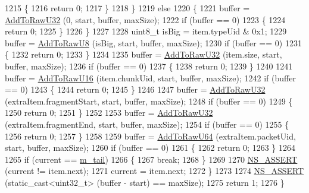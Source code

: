 \begin{DoxyCode}
1215             \{
1216               \textcolor{keywordflow}{return} 0;
1217             \}
1218         \}
1219       \textcolor{keywordflow}{else}
1220         \{
1221           buffer = \hyperlink{classns3_1_1PacketMetadata_a5ae4821ac2aae1d62c02243cdd27572a}{AddToRawU32} (0, start, buffer, maxSize);
1222           \textcolor{keywordflow}{if} (buffer == 0) 
1223             \{
1224               \textcolor{keywordflow}{return} 0;
1225             \}
1226         \}
1227 
1228       uint8\_t isBig = item.typeUid & 0x1;
1229       buffer = \hyperlink{classns3_1_1PacketMetadata_acf61c8b898fa059a3c3de4aa03c8c0c3}{AddToRawU8} (isBig, start, buffer, maxSize);
1230       \textcolor{keywordflow}{if} (buffer == 0) 
1231         \{
1232           \textcolor{keywordflow}{return} 0;
1233         \}
1234 
1235       buffer = \hyperlink{classns3_1_1PacketMetadata_a5ae4821ac2aae1d62c02243cdd27572a}{AddToRawU32} (item.size, start, buffer, maxSize);
1236       \textcolor{keywordflow}{if} (buffer == 0) 
1237         \{
1238           \textcolor{keywordflow}{return} 0;
1239         \}
1240 
1241       buffer = \hyperlink{classns3_1_1PacketMetadata_af48d704fec44aeedcfc257b6eb382e30}{AddToRawU16} (item.chunkUid, start, buffer, maxSize);
1242       \textcolor{keywordflow}{if} (buffer == 0) 
1243         \{
1244           \textcolor{keywordflow}{return} 0;
1245         \}
1246 
1247       buffer = \hyperlink{classns3_1_1PacketMetadata_a5ae4821ac2aae1d62c02243cdd27572a}{AddToRawU32} (extraItem.fragmentStart, start, buffer, maxSize);
1248       \textcolor{keywordflow}{if} (buffer == 0) 
1249         \{
1250           \textcolor{keywordflow}{return} 0;
1251         \}
1252 
1253       buffer = \hyperlink{classns3_1_1PacketMetadata_a5ae4821ac2aae1d62c02243cdd27572a}{AddToRawU32} (extraItem.fragmentEnd, start, buffer, maxSize);
1254       \textcolor{keywordflow}{if} (buffer == 0) 
1255         \{
1256           \textcolor{keywordflow}{return} 0;
1257         \}
1258 
1259       buffer = \hyperlink{classns3_1_1PacketMetadata_af872909b61feca47e71738b83a125b86}{AddToRawU64} (extraItem.packetUid, start, buffer, maxSize);
1260       \textcolor{keywordflow}{if} (buffer == 0) 
1261         \{
1262           \textcolor{keywordflow}{return} 0;
1263         \}
1264 
1265       \textcolor{keywordflow}{if} (current == \hyperlink{classns3_1_1PacketMetadata_ad24a659e236af7b98c475c97c4f60db9}{m\_tail})
1266         \{
1267           \textcolor{keywordflow}{break};
1268         \}
1269 
1270       \hyperlink{assert_8h_a6dccdb0de9b252f60088ce281c49d052}{NS\_ASSERT} (current != item.next);
1271       current = item.next;
1272     \}
1273 
1274   \hyperlink{assert_8h_a6dccdb0de9b252f60088ce281c49d052}{NS\_ASSERT} (static\_cast<uint32\_t> (buffer - start) == maxSize);
1275   \textcolor{keywordflow}{return} 1;
1276 \}
\end{DoxyCode}


